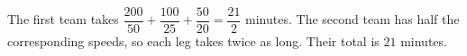 The first team takes $\dfrac{200}{50}+\dfrac{100}{25}+\dfrac{50}{20}=\dfrac{21}{2}$ minutes. The second team has half the corresponding speeds, so each leg takes twice as long. Their total is $\boxed{21}$ minutes.
